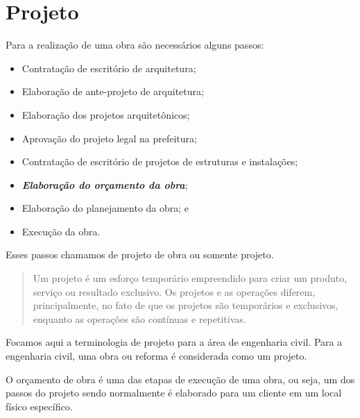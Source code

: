 \chapter{Projeto}
Para a realização de uma obra são necessários alguns passos:

\begin{itemize}
	\item Contratação de escritório de arquitetura;
	\item Elaboração de ante-projeto de arquitetura;
	\item Elaboração dos projetos arquitetônicos;
	\item Aprovação do projeto legal na prefeitura;
	\item Contratação de escritório de projetos de estruturas e instalações;
	\item \emph{\textbf{Elaboração do orçamento da obra}};
	\item Elaboração do planejamento da obra; e
	\item Execução da obra.
\end{itemize}

Esses passos chamamos de projeto de obra ou somente projeto.

\begin{quote}
Um projeto é um esforço temporário empreendido para criar um produto, serviço ou resultado exclusivo. Os projetos e as operações diferem, principalmente, no fato de que os projetos são temporários e exclusivos, enquanto as operações são contínuas e repetitivas. \cite{PMBOKDP}
\end{quote}

Focamos aqui a terminologia de projeto para a área de engenharia civil. Para a engenharia civil, uma obra ou reforma é considerada como um projeto.


O orçamento de obra é uma das etapas de execução de uma obra, ou seja, um dos passos do projeto sendo normalmente é elaborado para um cliente em um local físico específico.